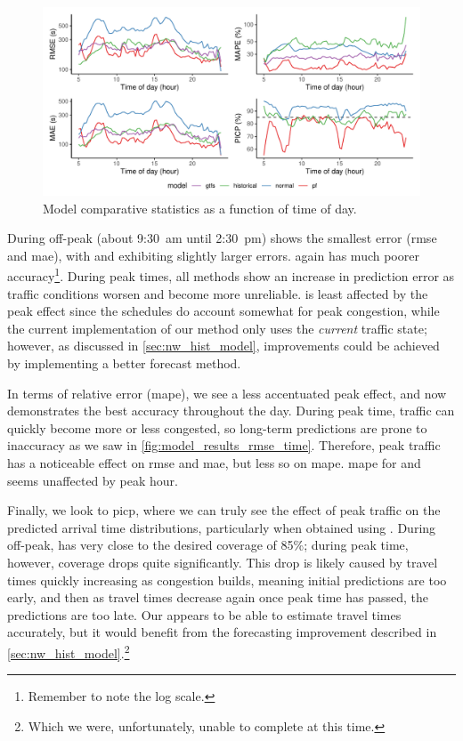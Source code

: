 \begin{knitrout}\small
{}\color{fgcolor}\begin{figure}
\includegraphics[width=\textwidth]{figure/model_results_rmse_timeofday-1} \caption[Model comparative statistics as a function of time of day]{Model comparative statistics as a function of time of day.}\label{fig:model_results_rmse_timeofday}
\end{figure}


\end{knitrout}

During off-peak (about 9:30~am until 2:30~pm) \Fpf{} shows the smallest error (\gls{rmse} and \gls{mae}), with \Fhist{} and \Fsched{} exhibiting slightly larger errors. \Fnorm{} again has much poorer accuracy\footnote{Remember to note the log scale.}. During peak times, all methods show an increase in prediction error as traffic conditions worsen and become more unreliable. \Fsched{} is least affected by the peak effect since the schedules do account somewhat for peak congestion, while the current implementation of our method only uses the \emph{current} traffic state; however, as discussed in \cref{sec:nw_hist_model}, improvements could be achieved by implementing a better forecast method.

In terms of relative error (\gls{mape}), we see a less accentuated peak effect, and now \Fpf{} demonstrates the best accuracy throughout the day. During peak time, traffic can quickly become more or less congested, so long-term predictions are prone to inaccuracy as we saw in \cref{fig:model_results_rmse_time}. Therefore, peak traffic has a noticeable effect on \gls{rmse} and \gls{mae}, but less so on \gls{mape}. \Gls{mape} for \Fsched{} and \Fhist{} seems unaffected by peak hour.


Finally, we look to \gls{picp}, where we can truly see the effect of peak traffic on the predicted arrival time distributions, particularly when obtained using \Fpf{}. During off-peak, \Fpf{} has very close to the desired coverage of 85\%; during peak time, however, coverage drops quite significantly. This drop is likely caused by travel times quickly increasing as congestion builds, meaning initial predictions are too early, and then as travel times decrease again once peak time has passed, the predictions are too late. Our \pf{} appears to be able to estimate travel times accurately, but it would benefit from the forecasting improvement described in \cref{sec:nw_hist_model}.\footnote{Which we were, unfortunately, unable to complete at this time.}




